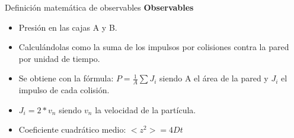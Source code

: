 \documentclass{beamer}
\begin{document}
\begin{frame}{Definición matemática de observables}
  \textbf{Observables}
  \begin{itemize}
    \item Presión en las cajas A y B.
    \item Calculándolas como la suma de los impulsos por colisiones contra la pared por unidad de tiempo.
    \item Se obtiene con la fórmula: $P = \frac{1}{A} \sum J_i$ siendo A el área de la pared y $J_i$ el impulso de cada colisión.
    \item $J_i = 2 * v_n$ siendo $v_n$ la velocidad de la partícula.
    \item Coeficiente cuadrático medio: $<z^2> = 4Dt$
  \end{itemize}
\end{frame}

\end{document}
